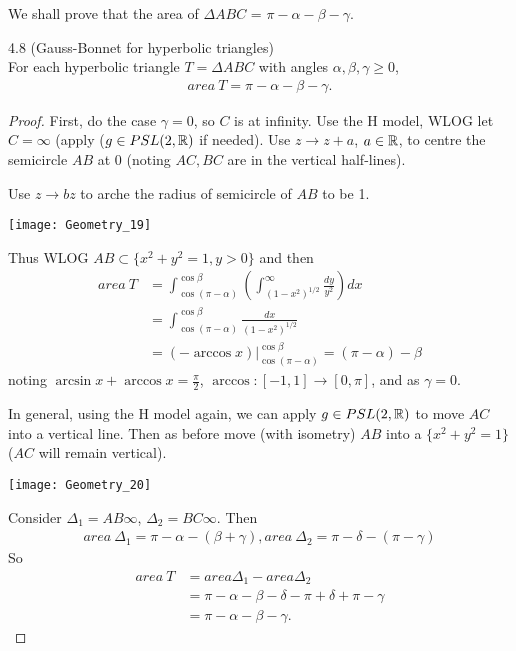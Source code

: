 \documentclass[a4paper]{article}
\begin{document}
We shall prove that the area of $\Delta ABC$ = $\pi-\alpha-\beta-\gamma$.

\begin{thm} 4.8 (Gauss-Bonnet for hyperbolic triangles)\\
For each hyperbolic triangle $T=\Delta ABC$ with angles $\alpha,\beta,\gamma \geq 0$,
\begin{equation*}
\begin{aligned}
area \ T =\pi-\alpha-\beta-\gamma.
\end{aligned}
\end{equation*}
\begin{proof}
First, do the case $\gamma=0$, so $C$ is at infinity. Use the H model, WLOG let $C=\infty$ (apply ($g \in PSL(2,\mathbb{R})$ if needed). Use $z \to z+a$, $a \in \mathbb{R}$, to centre the semicircle $AB$ at $0$ (noting $AC,BC$ are in the vertical half-lines).

Use $z \to bz$ to arche the radius of semicircle of $AB$ to be 1.

\texttt{[image: Geometry\_19]}

Thus WLOG $AB \subset \{x^2+y^2=1,y>0\}$ and then
\begin{equation*}
\begin{aligned}
area \ T &= \int_{\cos(\pi-\alpha)}^{\cos \beta} \left(\int_{(1-x^2)^{1/2}}^\infty \frac{dy}{y^2}\right)dx\\
&= \int_{\cos(\pi-\alpha)}^{\cos\beta} \frac{dx}{(1-x^2)^{1/2}}\\
&= (-\arccos x)|_{\cos(\pi-\alpha)}^{\cos\beta} = (\pi-\alpha)-\beta
\end{aligned}
\end{equation*}
noting $\arcsin x + \arccos x = \frac{\pi}{2}$, $\arccos:[-1,1] \to [0,\pi]$, and as $\gamma=0$.

In general, using the H model again, we can apply $g \in PSL(2,\mathbb{R})$ to move $AC$ into a vertical line. Then as before move (with isometry) $AB$ into a $\{x^2+y^2=1\}$ ($AC$ will remain vertical).

\texttt{[image: Geometry\_20]}

Consider $\Delta_1 = AB\infty$, $\Delta_2 = BC\infty$. Then
\begin{equation*}
\begin{aligned}
area \ \Delta_1 = \pi-\alpha-(\beta+\gamma), area \ \Delta_2 = \pi-\delta - (\pi-\gamma)
\end{aligned}
\end{equation*}
So
\begin{equation*}
\begin{aligned}
area \ T &= area \Delta_1 - area \Delta_2\\
&= \pi-\alpha-\beta-\delta-\pi+\delta+\pi-\gamma\\
&= \pi-\alpha-\beta-\gamma.
\end{aligned}
\end{equation*}
\end{proof}
\end{thm}
\end{document}
